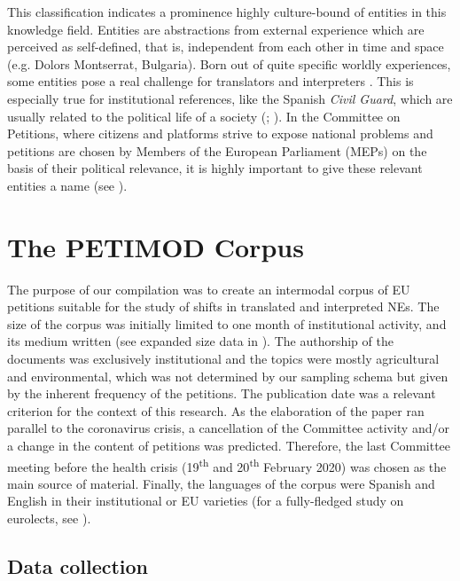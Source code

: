 \documentclass[output=paper]{langscibook}
\begin{document}
This classification indicates a prominence highly culture-bound of entities in this knowledge field. Entities are abstractions from external experience which are perceived as self-defined, that is, independent from each other in time and space (e.g. Dolors Montserrat, Bulgaria). Born out of quite specific worldly experiences, some entities pose a real challenge for translators and interpreters \citep{Mayoral1999}. This is especially true for institutional references, like the Spanish \textit{Civil Guard}, which are usually related to the political life of a society (\citealt{Martin1997}; \citealt{Ortega2002}). In the Committee on Petitions, where citizens and platforms strive to expose national problems and petitions are chosen by Members of the European Parliament (MEPs) on the basis of their political relevance, it is highly important to give these relevant entities a name (see ).

\section{The PETIMOD Corpus}\label{sec:corpas:3}

The purpose of our compilation was to create an intermodal corpus of EU petitions suitable for the study of shifts in translated and interpreted NEs. The size of the corpus was initially limited to one month of institutional activity, and its medium written (see expanded size data in ). The authorship of the documents was exclusively institutional and the topics were mostly agricultural and environmental, which was not determined by our sampling schema but given by the inherent frequency of the petitions. The publication date was a relevant criterion for the context of this research. As the elaboration of the paper ran parallel to the coronavirus crisis, a cancellation of the Committee activity and/or a change in the content of petitions was predicted. Therefore, the last Committee meeting before the health crisis (19\textsuperscript{th} and 20\textsuperscript{th} February 2020) was chosen as the main source of material.  Finally, the languages of the corpus were Spanish and English in their institutional or EU varieties (for a fully-fledged study on eurolects, see \citealt{Mori2018}).

\subsection{Data collection}\label{sec:corpas:3.1}
\end{document}
